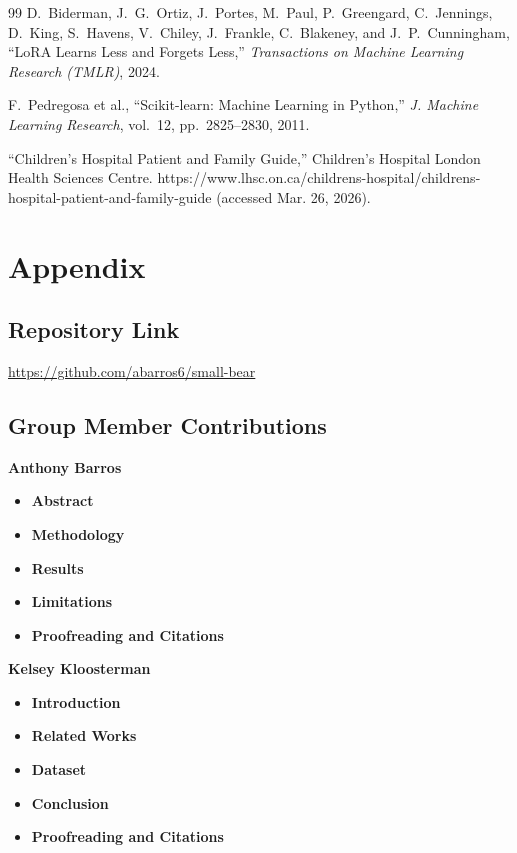 \documentclass[journal]{IEEEtai}
\begin{document}
\begin{thebibliography}{99}
D.~Biderman, J.~G.~Ortiz, J.~Portes, M.~Paul, P.~Greengard, C.~Jennings, D.~King, S.~Havens, V.~Chiley, J.~Frankle, C.~Blakeney, and J.~P.~Cunningham, ``LoRA Learns Less and Forgets Less,'' \textit{Transactions on Machine Learning Research (TMLR)}, 2024.

F.~Pedregosa et al., ``Scikit-learn: Machine Learning in Python,'' \textit{J. Machine Learning Research}, vol.~12, pp.~2825--2830, 2011.

“Children's Hospital Patient and Family Guide,” Children's Hospital London Health Sciences Centre. https://www.lhsc.on.ca/childrens-hospital/childrens-hospital-patient-and-family-guide (accessed Mar. 26, 2026).

\end{thebibliography}

\clearpage
\section*{Appendix}

\subsection{Repository Link}
\noindent \url{https://github.com/abarros6/small-bear}

\subsection{Group Member Contributions}
\textbf{Anthony Barros}
\begin{itemize}
    \item \textbf{Abstract}
    \item \textbf{Methodology} 
    \item \textbf{Results}
    \item \textbf{Limitations}
    \item \textbf{Proofreading and Citations}
\end{itemize}

\textbf{Kelsey Kloosterman}
\begin{itemize}
    \item \textbf{Introduction}
    \item \textbf{Related Works} 
    \item \textbf{Dataset} 
    \item \textbf{Conclusion}
    \item \textbf{Proofreading and Citations}
\end{itemize}
\end{document}
